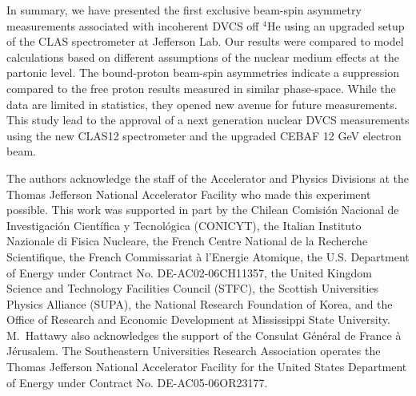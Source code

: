 \documentclass[twocolumn,nofootinbib,showpacs,prl,superscriptaddress,secnumarabic,amssymb,nobibnotes,aps,floatfix]{revtex4}
\begin{document}


In summary, we have presented the first exclusive beam-spin asymmetry measurements 
associated with incoherent DVCS off $^4$He using an upgraded setup of the CLAS 
spectrometer at Jefferson Lab. Our results were compared to model 
calculations based on different assumptions of the nuclear medium effects at 
the partonic level.
The bound-proton 
beam-spin asymmetries indicate a suppression compared to the free proton 
results measured in similar phase-space. While the data are limited in 
statistics, they opened new avenue for future measurements. This study lead to the approval of a next generation nuclear 
DVCS measurements \cite{Armstrong:2017wfw} using the new CLAS12 spectrometer and the upgraded CEBAF 12 GeV electron 
beam.      


The authors acknowledge the staff of the Accelerator and Physics Divisions at 
the Thomas Jefferson National Accelerator Facility who made this experiment 
possible. This work was supported in part by the Chilean Comisi\'on Nacional de 
Investigaci\'on Cient\'ifica y Tecnol\'ogica (CONICYT), the Italian Instituto 
Nazionale di Fisica Nucleare, the French Centre National de la Recherche 
Scientifique, the French Commissariat \`a l'Energie Atomique, the U.S.  
Department of Energy under Contract No. DE-AC02-06CH11357, the United Kingdom 
Science and Technology Facilities Council (STFC), the Scottish Universities 
Physics Alliance (SUPA), the National Research Foundation of Korea, and the 
Office of Research and Economic Development at Mississippi State University.  
M.~Hattawy also acknowledges the support of the Consulat G\'en\'eral de France 
\`a J\'erusalem.  The Southeastern Universities Research Association operates 
the Thomas Jefferson National Accelerator Facility for the United States 
Department of Energy under Contract No. DE-AC05-06OR23177.
\end{document}
